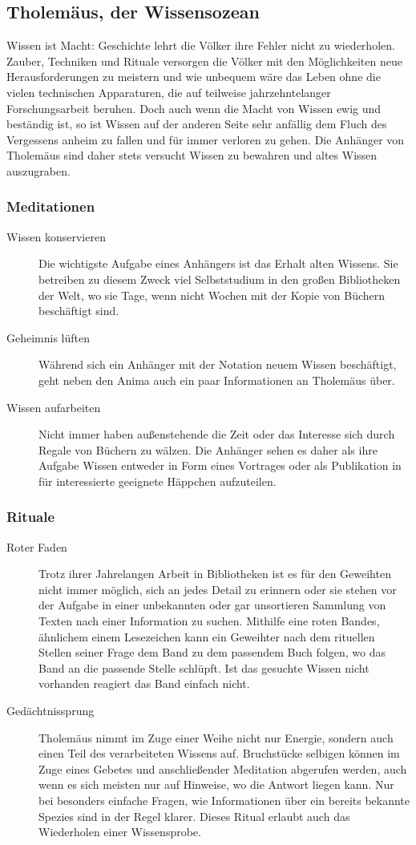 \documentclass[a4paper,12pt,oneside]{book}
\begin{document}
\subsection{Tholemäus, der Wissensozean}
Wissen ist Macht: Geschichte lehrt die Völker ihre Fehler nicht zu wiederholen. Zauber, Techniken und Rituale versorgen die Völker mit den Möglichkeiten neue Herausforderungen zu meistern und wie unbequem wäre das Leben ohne die vielen technischen Apparaturen, die auf teilweise jahrzehntelanger Forschungsarbeit beruhen. Doch auch wenn die Macht von Wissen ewig und beständig ist, so ist Wissen auf der anderen Seite sehr anfällig dem Fluch des Vergessens anheim zu fallen und für immer verloren zu gehen. Die Anhänger von Tholemäus sind daher stets versucht Wissen zu bewahren und altes Wissen auszugraben.
\subsubsection{Meditationen}
\begin{description}
\item[Wissen konservieren]
Die wichtigste Aufgabe eines Anhängers ist das Erhalt alten Wissens. Sie betreiben zu diesem Zweck viel Selbststudium in den großen Bibliotheken der Welt, wo sie Tage, wenn nicht Wochen mit der Kopie von Büchern beschäftigt sind.
\item[Geheimnis lüften]
Während sich ein Anhänger mit der Notation neuem Wissen beschäftigt, geht neben den Anima auch ein paar Informationen an Tholemäus über.
\item[Wissen aufarbeiten]
Nicht immer haben außenstehende die Zeit oder das Interesse sich durch Regale von Büchern zu wälzen. Die Anhänger sehen es daher als ihre Aufgabe Wissen entweder in Form eines Vortrages oder als Publikation in für interessierte geeignete Häppchen aufzuteilen.
\end{description}
\subsubsection{Rituale}
\begin{description}
\item[Roter Faden]
Trotz ihrer Jahrelangen Arbeit in Bibliotheken ist es für den Geweihten nicht immer möglich, sich an jedes Detail zu erinnern oder sie stehen vor der Aufgabe in einer unbekannten oder gar unsortieren Sammlung von Texten nach einer Information zu suchen. Mithilfe eine roten Bandes, ähnlichem einem Lesezeichen kann ein Geweihter nach dem rituellen Stellen seiner Frage dem Band zu dem passendem Buch folgen, wo das Band an die passende Stelle schlüpft. Ist das gesuchte Wissen nicht vorhanden reagiert das Band einfach nicht.
\item[Gedächtnissprung]
Tholemäus nimmt im Zuge einer Weihe nicht nur Energie, sondern auch einen Teil des verarbeiteten Wissens auf. Bruchstücke selbigen können im Zuge eines Gebetes und anschließender Meditation abgerufen werden, auch wenn es sich meisten nur auf Hinweise, wo die Antwort liegen kann. Nur bei besonders einfache Fragen, wie Informationen über ein bereits bekannte Spezies sind in der Regel klarer. Dieses Ritual erlaubt auch das Wiederholen einer Wissensprobe.
\end{description}
\end{document}
